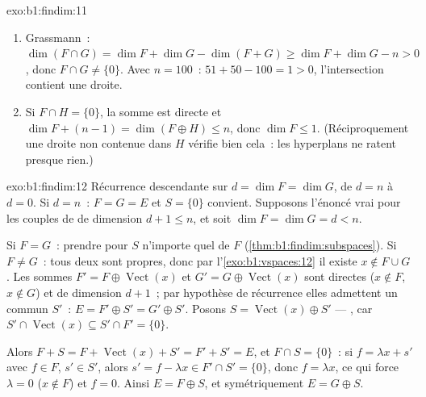 \begin{solution}{exo:b1:findim:11}
\begin{enumerate}
  \item Grassmann~: $\dim(F \cap G) = \dim F + \dim G - \dim(F +
        G) \geq \dim F + \dim G - n > 0$, donc $F \cap G \neq
        \{0\}$. Avec $n = 100$~: $51 + 50 - 100 = 1 > 0$,
        l'intersection contient une droite.
  \item Si $F \cap H = \{0\}$, la somme est directe et $\dim F +
        (n - 1) = \dim(F \oplus H) \leq n$, donc $\dim F \leq 1$.
        (Réciproquement une droite non contenue dans $H$ vérifie bien
        cela~: les hyperplans ne ratent presque rien.)
\end{enumerate}
\end{solution}

\begin{solution}{exo:b1:findim:12}
Récurrence descendante sur $d = \dim F = \dim G$, de $d = n$ à $d =
0$. Si $d = n$~: $F = G = E$ et $S = \{0\}$ convient. Supposons
l'énoncé vrai pour les couples de  de dimension $d + 1
\leq n$, et soit $\dim F = \dim G = d < n$.

Si $F = G$~: prendre pour $S$ n'importe quel  de $F$
(\cref{thm:b1:findim:subspaces}). Si $F \neq G$~: tous deux sont
propres, donc par l'\cref{exo:b1:vspaces:12} il existe $x \notin F \cup
G$. Les sommes $F' = F \oplus \operatorname{Vect}(x)$ et $G' = G
\oplus \operatorname{Vect}(x)$ sont directes ($x \notin F$, $x \notin
G$) et de dimension $d + 1$~; par hypothèse de récurrence elles
admettent un  commun $S'$~: $E = F' \oplus S' = G'
\oplus S'$. Posons $S = \operatorname{Vect}(x) \oplus S'$ --- , car $S' \cap \operatorname{Vect}(x) \subseteq S' \cap F' =
\{0\}$.

Alors $F + S = F + \operatorname{Vect}(x) + S' = F' + S' = E$, et
$F \cap S = \{0\}$~: si $f = \lambda x + s'$ avec $f \in F$, $s'
\in S'$, alors $s' = f - \lambda x \in F' \cap S' = \{0\}$, donc $f
= \lambda x$, ce qui force $\lambda = 0$ ($x \notin F$) et $f = 0$.
Ainsi $E = F \oplus S$, et symétriquement $E = G \oplus S$.
\end{solution}

